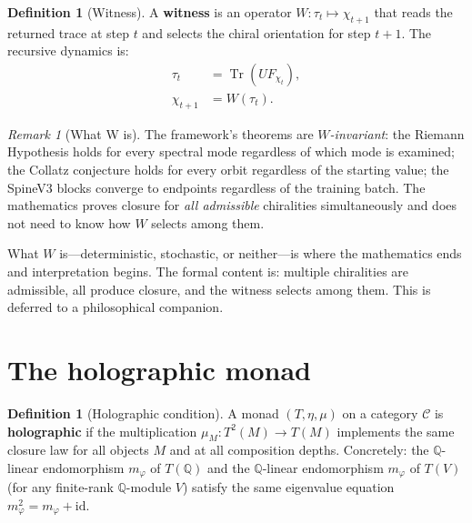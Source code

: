 \documentclass[11pt,a4paper]{article}
\theoremstyle{plain}
\theoremstyle{definition}
\newtheorem{definition}[theorem]{Definition}
\theoremstyle{remark}
\newtheorem{remark}[theorem]{Remark}
\numberwithin{equation}{section}
\providecommand{\Q}{\mathbb{Q}}
\providecommand{\vp}{\varphi}
\DeclareMathOperator{\Tr}{Tr}
\providecommand{\id}{\mathrm{id}}
\begin{document}
\begin{definition}[Witness]
\label{def:witness}
A \textbf{witness} is an operator $W\colon \tau_t \mapsto
\chi_{t+1}$ that reads the returned trace at step $t$ and
selects the chiral orientation for step $t+1$.  The recursive
dynamics is:
\begin{align}
  \tau_t &= \Tr(U F_{\chi_t}),
  \label{eq:trace-return}\\
  \chi_{t+1} &= W(\tau_t).
  \label{eq:witness-choice}
\end{align}
\end{definition}

\begin{remark}[What W is]
\label{rmk:witness-nature}
The framework's theorems are
\emph{$W$-invariant}: the Riemann Hypothesis holds for every
spectral mode regardless of which mode is examined; the Collatz
conjecture holds for every orbit regardless of the starting
value; the SpineV3 blocks converge to endpoints regardless of
the training batch.  The mathematics proves closure for
\emph{all admissible} chiralities simultaneously and does not
need to know how $W$ selects among them.

What $W$ is---deterministic, stochastic, or
neither---is where the mathematics ends and interpretation
begins.  The formal content is: multiple chiralities are
admissible, all produce closure, and the witness selects
among them.  This is deferred to a philosophical companion.
\end{remark}


\section{The holographic monad}
\label{sec:holographic}

\begin{definition}[Holographic condition]
\label{def:holographic}
A monad $(T, \eta, \mu)$ on a category $\mathcal{C}$ is
\textbf{holographic} if the multiplication
$\mu_M \colon T^2(M) \to T(M)$ implements the same closure law
for all objects $M$ and at all composition depths.  Concretely:
the $\Q$-linear endomorphism $m_\vp$ of $T(\Q)$ and the
$\Q$-linear endomorphism $m_\vp$ of $T(V)$ (for any finite-rank
$\Q$-module $V$) satisfy the same eigenvalue equation
$m_\vp^2 = m_\vp + \id$.
\end{definition}
\end{document}
